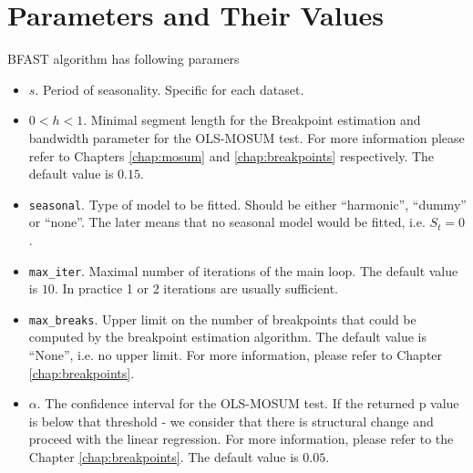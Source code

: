 \documentclass[main.tex]{subfiles}
\begin{document}
\section{Parameters and Their Values}
\label{sec:bfast_params}
BFAST algorithm has following paramers
\begin{itemize}
\item $s$. Period of seasonality. Specific for each dataset.
\item $0<h<1$. Minimal segment length for the Breakpoint estimation and
  bandwidth parameter for the OLS-MOSUM test. For more information please refer
  to Chapters \ref{chap:mosum} and \ref{chap:breakpoints} respectively.
  The default value is $0.15$.
\item \texttt{seasonal}. Type of model to be fitted. Should be either
  ``harmonic'', ``dummy'' or ``none''. The later means that no seasonal model
  would be fitted, i.e. $S_t=0$.
\item \texttt{max\_iter}. Maximal number of iterations of the main loop. The
  default value is $10$. In practice 1 or 2 iterations are usually sufficient.
\item \texttt{max\_breaks}. Upper limit on the number of breakpoints that could be computed by
  the breakpoint estimation algorithm. The default value is ``None'', i.e. no upper limit.
  For more information, please refer to Chapter \ref{chap:breakpoints}.
\item $\alpha$. The confidence interval for the OLS-MOSUM test. If the returned
  p value is below that threshold - we consider that there is structural change
  and proceed with the linear regression. For more information, please refer to
  the Chapter \ref{chap:breakpoints}. The default value is $0.05$. 
\end{itemize}

\biblio
\end{document}
